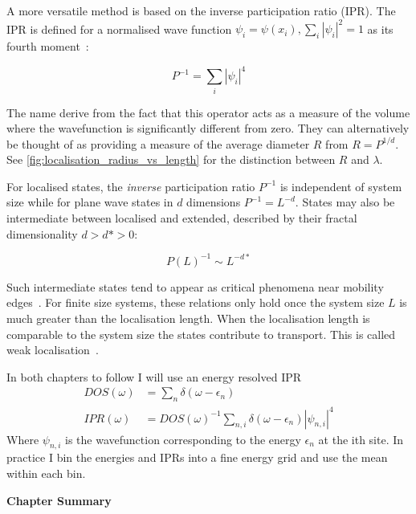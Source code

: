 A more versatile method is based on the inverse participation ratio (IPR). The IPR is defined for a normalised wave function \(\psi_i = \psi(x_i), \sum_i |\psi_i|^2 = 1\) as its fourth moment~\autocite{kramerLocalizationTheoryExperiment1993}:

\[
P^{-1} = \sum_i |\psi_i|^4
\]

The name derive from the fact that this operator acts as a measure of the volume where the wavefunction is significantly different from zero. They can alternatively be thought of as providing a measure of the average diameter \(R\) from \(R = P^{1/d}\). See \cref{fig:localisation_radius_vs_length} for the distinction between \(R\) and \(\lambda\).

For localised states, the \emph{inverse} participation ratio \(P^{-1}\) is independent of system size while for plane wave states in \(d\) dimensions \(P^{-1} = L^{-d}\). States may also be intermediate between localised and extended, described by their fractal dimensionality \(d > d* > 0\):

\[
P(L)^{-1} \sim L^{-d*} 
\]

Such intermediate states tend to appear as critical phenomena near mobility edges~\autocite{eversAndersonTransitions2008}. For finite size systems, these relations only hold once the system size \(L\) is much greater than the localisation length. When the localisation length is comparable to the system size the states contribute to transport. This is called weak localisation~\autocite{altshulerMagnetoresistanceHallEffect1980,dattaElectronicTransportMesoscopic1995}.

In both chapters to follow I will use an energy resolved IPR \[
\begin{aligned}
DOS(\omega) &= \sum_n \delta(\omega - \epsilon_n)\\
IPR(\omega) &= DOS(\omega)^{-1} \sum_{n,i} \delta(\omega - \epsilon_n) |\psi_{n,i}|^4
\end{aligned}
\] Where \(\psi_{n,i}\) is the wavefunction corresponding to the energy \(\epsilon_n\) at the ith site. In practice I bin the energies and IPRs into a fine energy grid and use the mean within each bin.

\textbf{Chapter Summary}

